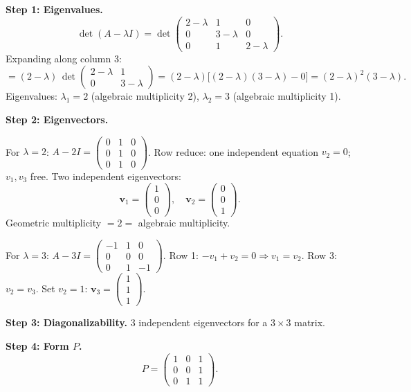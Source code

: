 \documentclass[12pt,a4paper]{article}
\begin{document}
\textbf{Step 1: Eigenvalues.}
\[
  \det(A-\lambda I) = \det\begin{pmatrix}2-\lambda&1&0\\0&3-\lambda&0\\0&1&2-\lambda\end{pmatrix}.
\]
Expanding along column 3:
\[
  = (2-\lambda)\,\det\begin{pmatrix}2-\lambda&1\\0&3-\lambda\end{pmatrix}
  = (2-\lambda)\bigl[(2-\lambda)(3-\lambda) - 0\bigr]
  = (2-\lambda)^2(3-\lambda).
\]
Eigenvalues: $\lambda_1 = 2$ (algebraic multiplicity 2), $\lambda_2 = 3$ (algebraic multiplicity 1).

\textbf{Step 2: Eigenvectors.}

For $\lambda = 2$: $A - 2I = \begin{pmatrix}0&1&0\\0&1&0\\0&1&0\end{pmatrix}$. Row reduce: one independent equation $v_2 = 0$; $v_1, v_3$ free.
Two independent eigenvectors:
\[
  \mathbf{v}_1 = \begin{pmatrix}1\\0\\0\end{pmatrix}, \quad \mathbf{v}_2 = \begin{pmatrix}0\\0\\1\end{pmatrix}.
\]
Geometric multiplicity $= 2 =$ algebraic multiplicity. \checkmark

For $\lambda = 3$: $A - 3I = \begin{pmatrix}-1&1&0\\0&0&0\\0&1&-1\end{pmatrix}$.
Row 1: $-v_1+v_2=0 \Rightarrow v_1=v_2$. Row 3: $v_2=v_3$. Set $v_2=1$: $\mathbf{v}_3 = \begin{pmatrix}1\\1\\1\end{pmatrix}$.

\textbf{Step 3: Diagonalizability.} 3 independent eigenvectors for a $3\times 3$ matrix. \checkmark

\textbf{Step 4: Form $P$.}
\[
  P = \begin{pmatrix}1&0&1\\0&0&1\\0&1&1\end{pmatrix}.
\]
\end{document}
